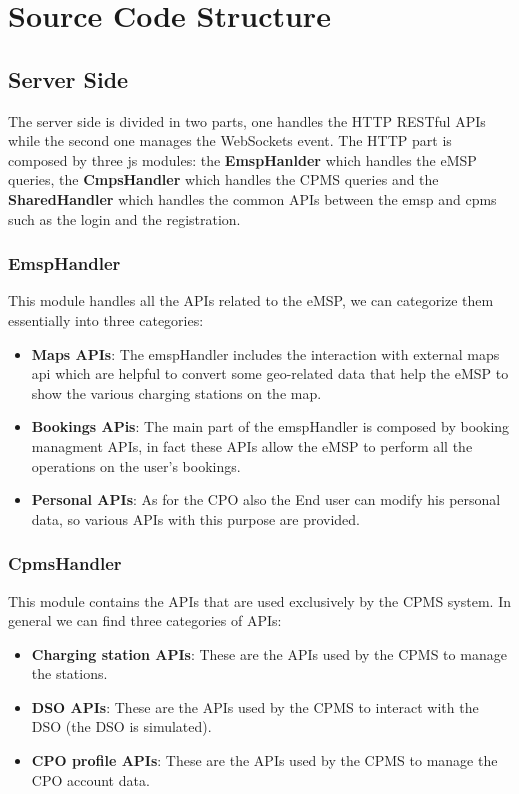 \chapter{Source Code Structure}
\section{Server Side}
The server side is divided in two parts, one handles the HTTP RESTful APIs while the second one manages the WebSockets event. The HTTP part is composed by three js modules: the \textbf{EmspHanlder} which handles the eMSP queries, the \textbf{CmpsHandler} which handles the CPMS queries and the \textbf{SharedHandler} which handles the common APIs between the emsp and cpms such as the login and the registration.
\subsection{EmspHandler}
This module handles all the APIs related to the eMSP, we can categorize them essentially into three categories:
\begin{itemize}
    \item \textbf{Maps APIs}: The emspHandler includes the interaction with external maps api which are helpful to convert some geo-related data that help the eMSP to show the various charging stations on the map.
    \item\textbf{Bookings APis}: The main part of the emspHandler is composed by booking managment APIs, in fact these APIs allow the eMSP to perform all the operations on the user's bookings.
    \item \textbf{Personal APIs}: As for the CPO also the End user can modify his personal data, so various APIs with this purpose are provided.
\end{itemize}
\subsection{CpmsHandler}
This module contains the APIs that are used exclusively by the CPMS system. In general we can find three categories of APIs:
\begin{itemize}
    \item \textbf{Charging station APIs}: These are the APIs used by the CPMS to manage the stations.
    \item \textbf{DSO APIs}: These are the APIs used by the CPMS to interact with the DSO (the DSO is simulated).
    \item \textbf{CPO profile APIs}: These are the APIs used by the CPMS to manage the CPO account data.
\end{itemize}
